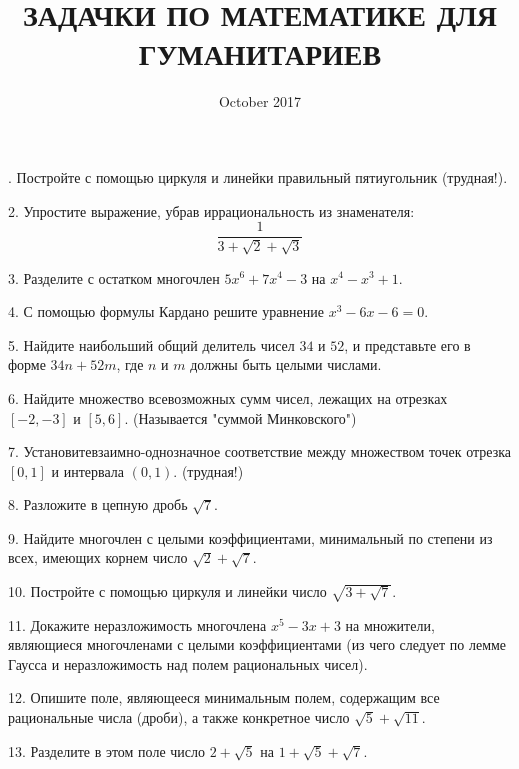 \documentclass{article}
\title{ЗАДАЧКИ ПО МАТЕМАТИКЕ ДЛЯ ГУМАНИТАРИЕВ}
\date{October 2017}
\begin{document}
\maketitle

. Постройте с помощью циркуля и линейки правильный пятиугольник (трудная!).

2. Упростите выражение, убрав иррациональность из знаменателя:
$$
\frac{1}{3+\sqrt{2}+\sqrt{3}}
$$

3. Разделите с остатком многочлен $5x^6 + 7x^4 - 3$ на $x^4 - x^3 + 1$.

4. С помощью формулы Кардано решите уравнение $x^3 - 6x - 6 = 0$.

5. Найдите наибольший общий делитель чисел $34$ и $52$, и представьте
его в форме $34n + 52m$, где $n$ и $m$ должны быть целыми числами.

6. Найдите множество всевозможных сумм чисел, лежащих на отрезках
$[-2,-3]$ и $[5,6]$. (Называется "суммой Минковского")

7. Установитевзаимно-однозначное соответствие между множеством
точек отрезка $[0,1]$ и интервала $(0,1)$. (трудная!)

8. Разложите в цепную дробь $\sqrt{7}$.

9. Найдите многочлен с целыми коэффициентами, минимальный по степени из
всех, имеющих корнем число $\sqrt{2} + \sqrt{7}$.

10. Постройте с помощью циркуля и линейки число $\sqrt{3+\sqrt{7}}$.

11. Докажите неразложимость многочлена $x^5 - 3x + 3$ на множители,
являющиеся многочленами с целыми коэффициентами (из чего следует
по лемме Гаусса и неразложимость над полем рациональных чисел).

12. Опишите поле, являющееся минимальным полем, содержащим все
рациональные числа (дроби), а также конкретное число $\sqrt{5} + \sqrt{11}$.

13. Разделите в этом поле число $2+\sqrt{5}$ на $1 + \sqrt{5} + \sqrt{7}$.
\end{document}
